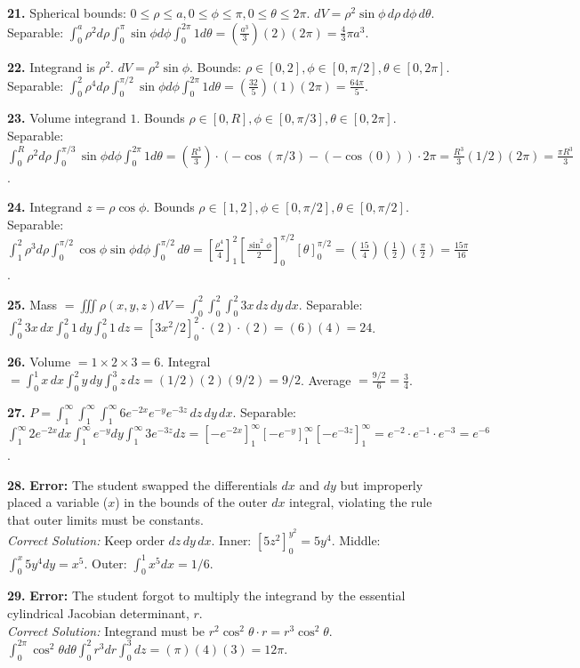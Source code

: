 \documentclass[11pt]{article}
\begin{document}
\textbf{21.} Spherical bounds: $0 \le \rho \le a, 0 \le \phi \le \pi, 0 \le \theta \le 2\pi$. $dV = \rho^2\sin\phi \,d\rho\,d\phi\,d\theta$.
Separable: $\int_0^a \rho^2 d\rho \int_0^\pi \sin\phi d\phi \int_0^{2\pi} 1 d\theta = (\frac{a^3}{3})(2)(2\pi) = \frac{4}{3}\pi a^3$.

\textbf{22.} Integrand is $\rho^2$. $dV = \rho^2\sin\phi$. Bounds: $\rho \in [0,2], \phi \in [0,\pi/2], \theta \in [0,2\pi]$.
Separable: $\int_0^2 \rho^4 d\rho \int_0^{\pi/2} \sin\phi d\phi \int_0^{2\pi} 1 d\theta = (\frac{32}{5})(1)(2\pi) = \frac{64\pi}{5}$.

\textbf{23.} Volume integrand $1$. Bounds $\rho \in [0,R], \phi \in [0,\pi/3], \theta \in [0,2\pi]$.
Separable: $\int_0^R \rho^2 d\rho \int_0^{\pi/3} \sin\phi d\phi \int_0^{2\pi} 1 d\theta = (\frac{R^3}{3}) \cdot (-\cos(\pi/3) - (-\cos(0))) \cdot 2\pi = \frac{R^3}{3}(1/2)(2\pi) = \frac{\pi R^3}{3}$.

\textbf{24.} Integrand $z = \rho\cos\phi$. Bounds $\rho \in [1,2], \phi \in [0,\pi/2], \theta \in [0,\pi/2]$.
Separable: $\int_1^2 \rho^3 d\rho \int_0^{\pi/2} \cos\phi\sin\phi d\phi \int_0^{\pi/2} d\theta = [\frac{\rho^4}{4}]_1^2 [\frac{\sin^2\phi}{2}]_0^{\pi/2} [\theta]_0^{\pi/2} = (\frac{15}{4})(\frac{1}{2})(\frac{\pi}{2}) = \frac{15\pi}{16}$.

\textbf{25.} Mass $= \iiint \rho(x,y,z) dV = \int_0^2 \int_0^2 \int_0^2 3x \,dz\,dy\,dx$.
Separable: $\int_0^2 3x \,dx \int_0^2 1 \,dy \int_0^2 1 \,dz = [3x^2/2]_0^2 \cdot (2) \cdot (2) = (6)(4) = 24$.

\textbf{26.} Volume $= 1 \times 2 \times 3 = 6$. Integral $= \int_0^1 x \,dx \int_0^2 y \,dy \int_0^3 z \,dz = (1/2)(2)(9/2) = 9/2$. Average $= \frac{9/2}{6} = \frac{3}{4}$.

\textbf{27.} $P = \int_1^\infty \int_1^\infty \int_1^\infty 6e^{-2x}e^{-y}e^{-3z} \,dz\,dy\,dx$.
Separable: $\int_1^\infty 2e^{-2x} dx \int_1^\infty e^{-y} dy \int_1^\infty 3e^{-3z} dz = [ -e^{-2x} ]_1^\infty [ -e^{-y} ]_1^\infty [ -e^{-3z} ]_1^\infty = e^{-2} \cdot e^{-1} \cdot e^{-3} = e^{-6}$.

\textbf{28.} \textbf{Error:} The student swapped the differentials $dx$ and $dy$ but improperly placed a variable ($x$) in the bounds of the outer $dx$ integral, violating the rule that outer limits must be constants. \\
\textit{Correct Solution:} Keep order $dz\,dy\,dx$. Inner: $[5z^2]_0^{y^2} = 5y^4$. Middle: $\int_0^x 5y^4 dy = x^5$. Outer: $\int_0^1 x^5 dx = 1/6$.

\textbf{29.} \textbf{Error:} The student forgot to multiply the integrand by the essential cylindrical Jacobian determinant, $r$. \\
\textit{Correct Solution:} Integrand must be $r^2\cos^2\theta \cdot r = r^3 \cos^2\theta$. $\int_0^{2\pi}\cos^2\theta d\theta \int_0^2 r^3 dr \int_0^3 dz = (\pi)(4)(3) = 12\pi$.
\end{document}
